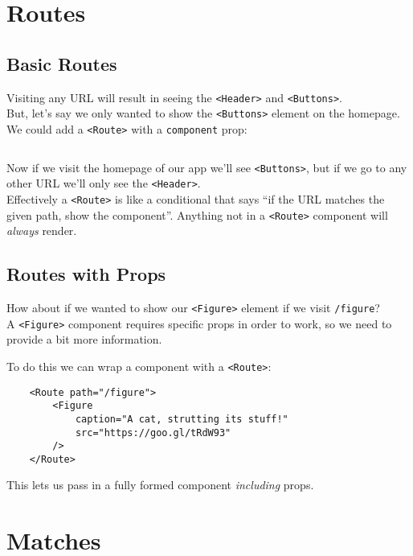 \pagebreak


\section{Routes}

\subsection{Basic Routes}

Visiting any URL will result in seeing the \texttt{<Header>} and \texttt{<Buttons>}.
\\

But, let's say we only wanted to show the \texttt{<Buttons>} element on the homepage. We could add a \texttt{<Route>} with a \texttt{component} prop:

\inputminted{jsx}{04/figures/01/02-component.jsx}

Now if we visit the homepage of our app we'll see \texttt{<Buttons>}, but if we go to any other URL we'll only see the \texttt{<Header>}.
\\

Effectively a \texttt{<Route>} is like a conditional that says ``if the URL matches the given path, show the component''. Anything not in a \texttt{<Route>} component will \textit{always} render.


\subsection{Routes with Props}

How about if we wanted to show our \texttt{<Figure>} element if we visit \texttt{/figure}?
\\

A \texttt{<Figure>} component requires specific props in order to work, so we need to provide a bit more information.

\pagebreak

To do this we can wrap a component with a \texttt{<Route>}:

\begin{verbatim}
    <Route path="/figure">
        <Figure
            caption="A cat, strutting its stuff!"
            src="https://goo.gl/tRdW93"
        />
    </Route>
\end{verbatim}

This lets us pass in a fully formed component \textit{including} props.



\section{Matches}

